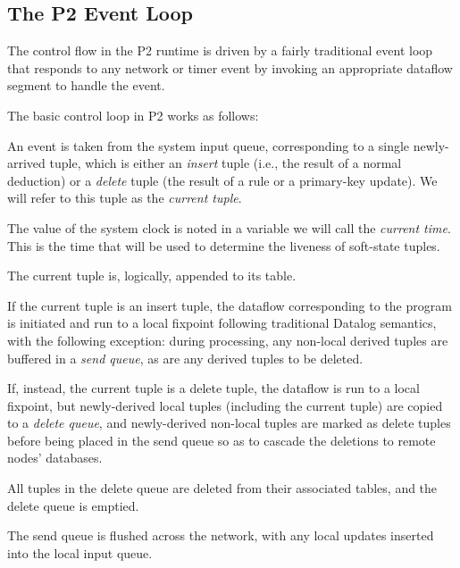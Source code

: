 \subsection{The P2 Event Loop}
\label{sec:eventloop}

The control flow in the P2 runtime is driven by a fairly traditional event loop
that responds to any network or timer event by invoking an appropriate dataflow
segment to handle the event.

The basic control loop in P2 works as follows:
\begin{CompactEnumerate}
    \item An event is taken from the system input queue, corresponding to a single newly-arrived tuple, which is either an {\em insert} tuple (i.e., the result of a normal deduction) or a {\em delete} tuple (the result of a  rule or a primary-key update).  We will refer to this tuple as the {\em current tuple}.
    \item The value of the system clock is noted in a variable we will call the {\em current time}.  This is the time that will be used to determine the liveness of soft-state tuples.  
    \item The current tuple is, logically, appended to its table.
    \item If the current tuple is an insert tuple, the dataflow corresponding to the \OVERLOG program is initiated and run to a local fixpoint following traditional Datalog semantics, with the following exception: during processing, any non-local derived tuples are buffered in a {\em send queue}, as are any derived tuples to be deleted.
    \item If, instead, the current tuple is a delete tuple, the dataflow
    is run to a local fixpoint, but newly-derived local tuples
    (including the current tuple) are copied to a {\em delete queue},
    and newly-derived non-local tuples are marked as delete tuples
    before being placed in the send queue so as to cascade the deletions
    to remote nodes' databases.
    \item All tuples in the delete queue are deleted from their associated tables, and the delete queue is emptied.
    \item The send queue is flushed across the network, with any local updates inserted into the local input queue.
\end{CompactEnumerate}

